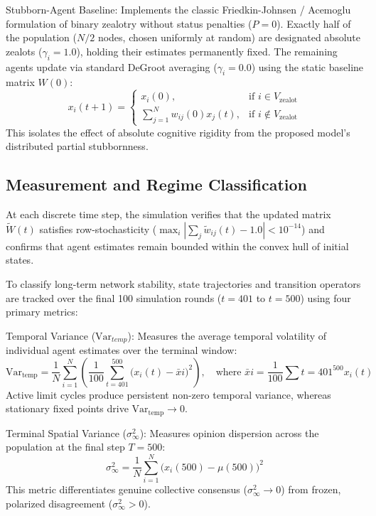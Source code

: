 Stubborn-Agent Baseline: Implements the classic Friedkin-Johnsen / Acemoglu formulation of binary zealotry without status penalties ($P = 0$)\cite{degroot1974reaching,friedkin1990social}. Exactly half of the population ($N/2$ nodes, chosen uniformly at random) are designated absolute zealots ($\gamma_i = 1.0$), holding their estimates permanently fixed\cite{degroot1974reaching,friedkin1990social}. The remaining agents update via standard DeGroot averaging ($\gamma_i = 0.0$) using the static baseline matrix $W(0)$\cite{degroot1974reaching,friedkin1990social}: $$x_i(t+1) = \begin{cases} x_i(0), & \text{if } i \in V_{\text{zealot}} \\ \sum_{j=1}^N w_{ij}(0) x_j(t), & \text{if } i \notin V_{\text{zealot}} \end{cases}$$ This isolates the effect of absolute cognitive rigidity from the proposed model's distributed partial stubbornness\cite{degroot1974reaching}.

\subsection{Measurement and Regime Classification}
At each discrete time step, the simulation verifies that the updated matrix $\tilde{W}(t)$ satisfies row-stochasticity ($\max_i |\sum_j \tilde{w}_{ij}(t) - 1.0| < 10^{-14}$) and confirms that agent estimates remain bounded within the convex hull of initial states\cite{degroot1974reaching,friedkin1990social}.

To classify long-term network stability, state trajectories and transition operators are tracked over the final 100 simulation rounds ($t = 401$ to $t = 500$) using four primary metrics\cite{degroot1974reaching,acemoglu2013opinion}:

Temporal Variance ($\text{Var}_{temp}$): Measures the average temporal volatility of individual agent estimates over the terminal window\cite{degroot1974reaching}: $$\text{Var}_{\text{temp}} = \frac{1}{N} \sum_{i=1}^N \left( \frac{1}{100} \sum_{t=401}^{500} \big(x_i(t) - \bar{x}i\big)^2 \right), \quad \text{where } \bar{x}i = \frac{1}{100} \sum{t=401}^{500} x_i(t)$$ Active limit cycles produce persistent non-zero temporal variance, whereas stationary fixed points drive $\text{Var}_{\text{temp}} \to 0$\cite{acemoglu2013opinion}.

Terminal Spatial Variance ($\sigma_{\infty}^2$): Measures opinion dispersion across the population at the final step $T = 500$\cite{acemoglu2013opinion}: $$\sigma_{\infty}^2 = \frac{1}{N} \sum_{i=1}^N \big(x_i(500) - \mu(500)\big)^2$$ This metric differentiates genuine collective consensus ($\sigma_{\infty}^2 \to 0$) from frozen, polarized disagreement ($\sigma_{\infty}^2 > 0$)\cite{acemoglu2013opinion}.

